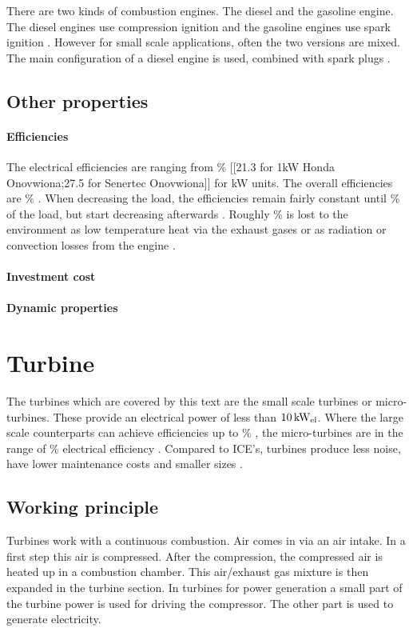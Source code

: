 There are two kinds of combustion engines. The diesel and the gasoline engine. The diesel engines use compression ignition and the gasoline engines use spark ignition \cite{Onovwiona2006}. However for small scale applications, often the two versions are mixed. The main configuration of a diesel engine is used, combined with spark plugs \cite{Onovwiona2006}.
\subsection{Other properties}
\paragraph{Efficiencies}
The electrical efficiencies are ranging from \unit[20-30]{\%} [[21.3 for 1kW Honda Onovwiona;27.5 for Senertec Onovwiona]] for \unit[1-5]{kW} units. The overall efficiencies are \unit[85-90]{\%} \cite{Onovwiona2006}. When decreasing the load, the efficiencies remain fairly constant until \unit[75]{\%} of the load, but start decreasing afterwards \cite{Onovwiona2006}. Roughly \unit[10]{\%} is lost to the environment as low temperature heat via the exhaust gases or as radiation or convection losses from the engine \cite{Onovwiona2006}.
\paragraph{Investment cost}
\paragraph{Dynamic properties}

\section{Turbine}
The turbines which are covered by this text are the small scale turbines or micro-turbines. These provide an electrical power of less than $\unit[10]{kW_{el}}$. Where the large scale counterparts can achieve efficiencies up to \unit[60]{\%} \cite{EPA2008}, the micro-turbines are in the range of \unit[20-35]{\%} electrical efficiency \cite{Onovwiona2006}. Compared to ICE's, turbines produce less noise, have lower maintenance costs and smaller sizes \cite{Onovwiona2006}.
\subsection{Working principle}
Turbines work with a continuous combustion. Air comes in via an air intake. In a first step this air is compressed. After the compression, the compressed air is heated up in a combustion chamber. This air/exhaust gas mixture is then expanded in the turbine section. In turbines for power generation a small part of the turbine power is used for driving the compressor. The other part is used to generate electricity.

